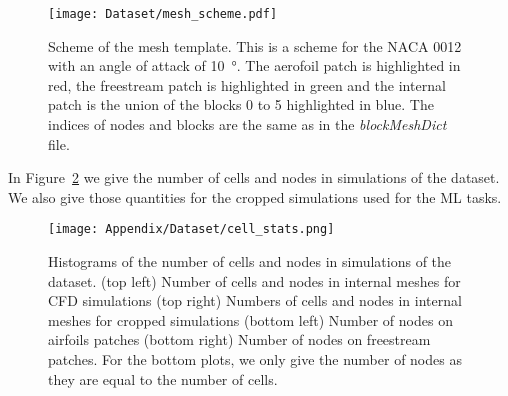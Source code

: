 \begin{subappendices}
	\begin{figure}
		\centering
		\texttt{[image: Dataset/mesh\_scheme.pdf]}
		\caption{Scheme of the mesh template. This is a scheme for the NACA 0012 with an angle of attack of \SI{10}{\degree}. The aerofoil patch is highlighted in red, the freestream patch is highlighted in green and the internal patch is the union of the blocks 0 to 5 highlighted in blue. The indices of nodes and blocks are the same as in the \emph{blockMeshDict} file.}
		\label{fig:sch_mesh}
	\end{figure}
	
	In Figure~\ref{fig:data_stats} we give the number of cells and nodes in simulations of the dataset. We also give those quantities for the cropped simulations used for the ML tasks.
	
	\begin{figure}
		\centering
		\texttt{[image: Appendix/Dataset/cell\_stats.png]}
		\caption{Histograms of the number of cells and nodes in simulations of the dataset. (top left) Number of cells and nodes in internal meshes for CFD simulations (top right) Numbers of cells and nodes in internal meshes for cropped simulations (bottom left) Number of nodes on airfoils patches (bottom right) Number of nodes on freestream patches. For the bottom plots, we only give the number of nodes as they are equal to the number of cells.}
		\label{fig:data_stats}
	\end{figure}
	

\end{subappendices}
